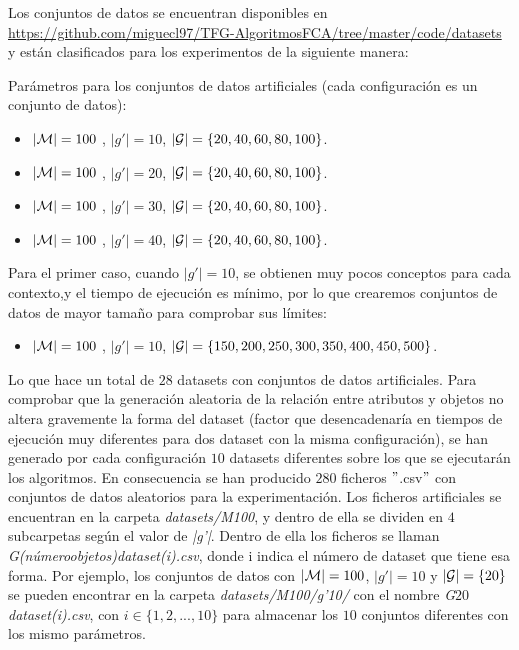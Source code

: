 \documentclass[oneside,openright,titlepage,numbers=noenddot,openany,headinclude,footinclude=true,
cleardoublepage=empty,abstractoff,BCOR=5mm,paper=a4,fontsize=12pt,main=spanish]{scrreprt}
\begin{document}
Los conjuntos de datos se encuentran disponibles en \href{https://github.com/miguecl97/TFG-AlgoritmosFCA/tree/master/code/datasets}{https://github.com/miguecl97/\linebreak TFG-AlgoritmosFCA/tree/master/code/datasets} y están clasificados para los experimentos de la siguiente manera:

Parámetros para los conjuntos de datos artificiales (cada configuración es un conjunto de datos):
\begin{itemize}
    \item \textbf{$|\mathcal{M}|=100$} , \textbf{$|g'|=10$}, \textbf{$|\mathcal{G}|=\{20,40,60,80,100\}$}.
    \item \textbf{$|\mathcal{M}|=100$} , \textbf{$|g'|=20$}, \textbf{$|\mathcal{G}|=\{20,40,60,80,100\}$}.
    \item \textbf{$|\mathcal{M}|=100$} , \textbf{$|g'|=30$}, \textbf{$|\mathcal{G}|=\{20,40,60,80,100\}$}.
    \item \textbf{$|\mathcal{M}|=100$} , \textbf{$|g'|=40$}, \textbf{$|\mathcal{G}|=\{20,40,60,80,100\}$}.
\end{itemize}

Para el primer caso, cuando $|g'|=10$, se obtienen muy pocos conceptos para cada contexto,y el tiempo de ejecución es mínimo, por lo que crearemos conjuntos de datos de mayor tamaño para comprobar sus límites:
\begin{itemize}
    \item \textbf{$|\mathcal{M}|=100$} , \textbf{$|g'|=10$}, \textbf{$|\mathcal{G}|=\{150,200,250,300,350,400,450,500\}$}.
\end{itemize}


Lo que hace un total de $28$ datasets con conjuntos de datos artificiales. Para comprobar que la generación aleatoria de la relación entre atributos y objetos no altera gravemente la forma del dataset (factor que desencadenaría en tiempos de ejecución muy diferentes para dos dataset con la misma configuración), se han generado por cada configuración $10$ datasets diferentes sobre los que se ejecutarán los algoritmos. En consecuencia se han producido $280$ ficheros $"$.csv$"$ con conjuntos de datos aleatorios para la experimentación. Los ficheros artificiales se encuentran en la carpeta \textit{datasets/M100}, y dentro de ella se dividen en $4$ subcarpetas según el valor de \textit{|g'|}. Dentro de ella los ficheros se llaman \textit{G(númeroobjetos)dataset(i).csv}, donde i indica el número de dataset que tiene esa forma. Por ejemplo, los conjuntos de datos con \textbf{$|\mathcal{M}|=100$}, \textbf{$|g'|=10$} y \textbf{$|\mathcal{G}|=\{20\}$} se pueden encontrar en la carpeta \textit{datasets/M100/g'10/} con el nombre \textit{G$20$dataset(i).csv}, con $i \in \{1,2,...,10\}$ para almacenar los $10$ conjuntos diferentes con los mismo parámetros.
\end{document}
